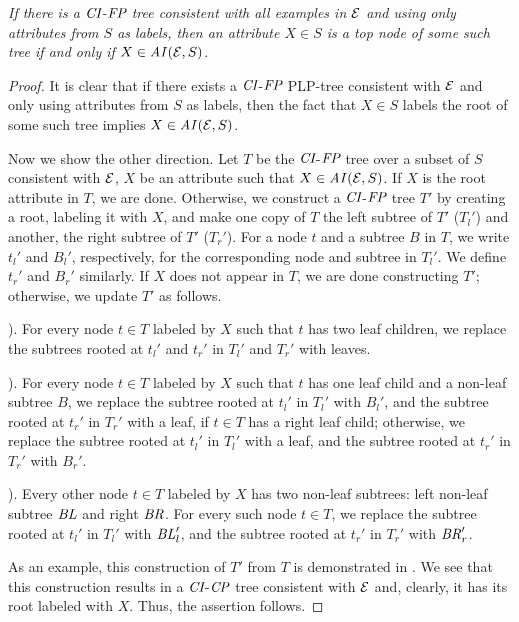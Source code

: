 \begin{prop}
\label{prop:2}
{\it If there is a $\textit{CI}$-$\textit{FP}$ tree consistent with all examples in $\mathcal{E}$ and 
using only attributes from $S$ as labels, then an attribute $X\in S$ is a top node
of some such tree if and only if $X\in \mathit{AI}(\mathcal{E},S)$.}
\end{prop}
\begin{proof}
	It is clear that if there exists a $\textit{CI}$-$\textit{FP}$ PLP-tree consistent with $\mathcal{E}$
	and only using attributes from $S$ as labels, then the fact that
	$X \in S$ labels the root of some such tree implies $X \in \mathit{AI}(\mathcal{E},S)$.

	Now we show the other direction.
	Let $T$ be the $\textit{CI}$-$\textit{FP}$ tree over a subset of $S$ consistent 
	with $\mathcal{E}$,
	$X$ be an attribute such that $X \in \mathit{AI}(\mathcal{E},S)$.
	If $X$ is the root attribute in $T$, we are done.
	Otherwise, we construct a $\textit{CI}$-$\textit{FP}$ tree $T'$ by creating a root, 
	labeling it with $X$, and make one copy of $T$ the left subtree of $T'$
        ($T_l'$) and another, the right subtree of $T'$ ($T_r'$).
	For a node $t$ and a subtree $B$ in $T$, we write $t_l'$ and $B_l'$, 
	respectively, for the corresponding node and subtree in $T_l'$.
	We define $t_r'$ and $B_r'$ similarly. If $X$ does not appear in 
	$T$, we are done constructing $T'$; otherwise, we update $T'$ as 
	follows.

	). For every node $t\in T$ labeled by $X$ such that $t$ has two leaf children,
	we replace the subtrees rooted at $t_l'$ and $t_r'$ in $T_l'$ and $T_r'$ with leaves.

	). For every node $t \in T$ labeled by $X$ such that $t$ has one leaf child
	and a non-leaf subtree $B$, we replace the subtree rooted at $t_l'$ in $T_l'$ with $B_l'$,
	and the subtree rooted at $t_r'$ in $T_r'$ with a leaf,
	if $t \in T$ has a right leaf child; otherwise, we replace the subtree rooted at
	$t_l'$ in $T_l'$ with a leaf, and the subtree rooted at $t_r'$ in $T_r'$ with $B_r'$.

	). Every other node $t \in T$ labeled by $X$ has two non-leaf subtrees:
	left non-leaf subtree $\mathit{BL}$ and right $\mathit{BR}$.
	For every such node $t \in T$, we replace the subtree rooted at $t_l'$ in $T_l'$ with
	$\mathit{BL}_l'$, and the subtree rooted at $t_r'$ in $T_r'$ with $\mathit{BR}_r'$.

	As an example, this construction of $T'$ from $T$ is demonstrated in .
	We see that this construction results in a $\textit{CI}$-$\textit{CP}$ tree consistent
	with $\mathcal{E}$ and, clearly, it has its root labeled with $X$.
	Thus, the assertion follows.
\end{proof}

